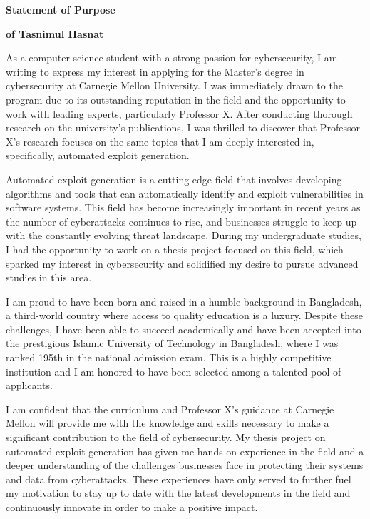 \documentclass{letter}
\begin{document}
\begin{center}

\textbf{\Large Statement of Purpose} 

\textbf{\Large of Tasnimul Hasnat}

\end{center}

As a computer science student with a strong passion for cybersecurity, I am writing to express my interest in applying for the Master's degree in cybersecurity at Carnegie Mellon University. I was immediately drawn to the program due to its outstanding reputation in the field and the opportunity to work with leading experts, particularly Professor X. After conducting thorough research on the university's publications, I was thrilled to discover that Professor X's research focuses on the same topics that I am deeply interested in, specifically, automated exploit generation.

Automated exploit generation is a cutting-edge field that involves developing algorithms and tools that can automatically identify and exploit vulnerabilities in software systems. This field has become increasingly important in recent years as the number of cyberattacks continues to rise, and businesses struggle to keep up with the constantly evolving threat landscape. During my undergraduate studies, I had the opportunity to work on a thesis project focused on this field, which sparked my interest in cybersecurity and solidified my desire to pursue advanced studies in this area.

I am proud to have been born and raised in a humble background in Bangladesh, a third-world country where access to quality education is a luxury. Despite these challenges, I have been able to succeed academically and have been accepted into the prestigious Islamic University of Technology in Bangladesh, where I was ranked 195th in the national admission exam. This is a highly competitive institution and I am honored to have been selected among a talented pool of applicants.

I am confident that the curriculum and Professor X's guidance at Carnegie Mellon will provide me with the knowledge and skills necessary to make a significant contribution to the field of cybersecurity. My thesis project on automated exploit generation has given me hands-on experience in the field and a deeper understanding of the challenges businesses face in protecting their systems and data from cyberattacks. These experiences have only served to further fuel my motivation to stay up to date with the latest developments in the field and continuously innovate in order to make a positive impact.
\end{document}
